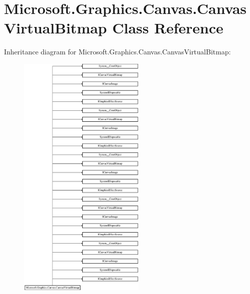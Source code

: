 \hypertarget{class_microsoft_1_1_graphics_1_1_canvas_1_1_canvas_virtual_bitmap}{}\section{Microsoft.\+Graphics.\+Canvas.\+Canvas\+Virtual\+Bitmap Class Reference}
\label{class_microsoft_1_1_graphics_1_1_canvas_1_1_canvas_virtual_bitmap}
Inheritance diagram for Microsoft.\+Graphics.\+Canvas.\+Canvas\+Virtual\+Bitmap\+:\begin{figure}[H]
\begin{center}
\leavevmode
\includegraphics[height=12.000000cm]{class_microsoft_1_1_graphics_1_1_canvas_1_1_canvas_virtual_bitmap}
\end{center}
\end{figure}
